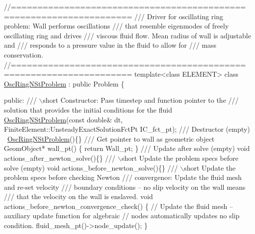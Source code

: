 \begin{DoxyCodeInclude}
\textcolor{comment}{//====================================================================}\textcolor{comment}{}
\textcolor{comment}{/// Driver for oscillating ring problem: Wall performs oscillations}
\textcolor{comment}{/// that resemble eigenmodes of freely oscillating ring and drives}
\textcolor{comment}{/// viscous fluid flow. Mean radius of wall is adjustable and}
\textcolor{comment}{/// responds to a pressure value in the fluid to allow for}
\textcolor{comment}{/// mass conservation. }
\textcolor{comment}{}\textcolor{comment}{//====================================================================}
\textcolor{keyword}{template}<\textcolor{keyword}{class} ELEMENT>
\textcolor{keyword}{class }\hyperlink{classOscRingNStProblem}{OscRingNStProblem} : \textcolor{keyword}{public} Problem
\{

\textcolor{keyword}{public}:
\textcolor{comment}{}
\textcolor{comment}{ /// \(\backslash\)short Constructor: Pass timestep and function pointer to the }
\textcolor{comment}{ /// solution that provides the initial conditions for the fluid}
\textcolor{comment}{} \hyperlink{classOscRingNStProblem}{OscRingNStProblem}(\textcolor{keyword}{const} \textcolor{keywordtype}{double}& dt,
                   FiniteElement::UnsteadyExactSolutionFctPt IC\_fct\_pt);
\textcolor{comment}{}
\textcolor{comment}{ /// Destructor (empty)}
\textcolor{comment}{} ~\hyperlink{classOscRingNStProblem}{OscRingNStProblem}()\{\}
\textcolor{comment}{}
\textcolor{comment}{ /// Get pointer to wall as geometric object}
\textcolor{comment}{} GeomObject* wall\_pt()
  \{
   \textcolor{keywordflow}{return} Wall\_pt;
  \}
\textcolor{comment}{}
\textcolor{comment}{ /// Update after solve (empty)}
\textcolor{comment}{} \textcolor{keywordtype}{void} actions\_after\_newton\_solve()\{\}
\textcolor{comment}{}
\textcolor{comment}{ /// \(\backslash\)short Update the problem specs before solve (empty)}
\textcolor{comment}{} \textcolor{keywordtype}{void} actions\_before\_newton\_solve()\{\}
\textcolor{comment}{}
\textcolor{comment}{ /// \(\backslash\)short Update the problem specs before checking Newton}
\textcolor{comment}{ /// convergence: Update the fluid mesh and re-set velocity}
\textcolor{comment}{ ///  boundary conditions -- no slip velocity on the wall means}
\textcolor{comment}{ /// that the velocity on the wall is enslaved.}
\textcolor{comment}{} \textcolor{keywordtype}{void} actions\_before\_newton\_convergence\_check() 
 \{
  \textcolor{comment}{// Update the fluid mesh -- auxiliary update function for algebraic}
  \textcolor{comment}{// nodes automatically updates no slip condition.}
  fluid\_mesh\_pt()->node\_update(); 
 \}


\end{DoxyCodeInclude}
